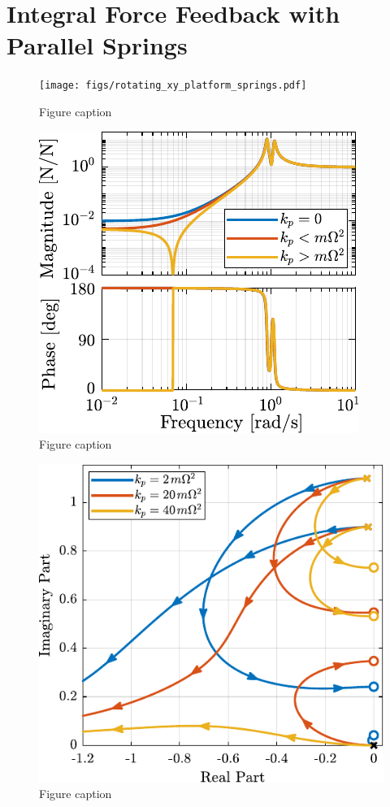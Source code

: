 \documentclass{ISMA_USD2020}
\begin{document}
\section{Integral Force Feedback with Parallel Springs}
\label{sec:orgd4915d5}

\begin{figure}[htbp]
\centering
\texttt{[image: figs/rotating\_xy\_platform\_springs.pdf]}
\caption{\label{fig:rotating_xy_platform_springs}Figure caption}
\end{figure}

\begin{figure}[htbp]
\centering
\includegraphics[scale=1]{figs/plant_iff_kp.pdf}
\caption{\label{fig:plant_iff_kp}Figure caption}
\end{figure}

\begin{figure}[htbp]
\centering
\includegraphics[scale=1]{figs/root_locus_iff_kps.pdf}
\caption{\label{fig:root_locus_iff_kps}Figure caption}
\end{figure}
\end{document}
